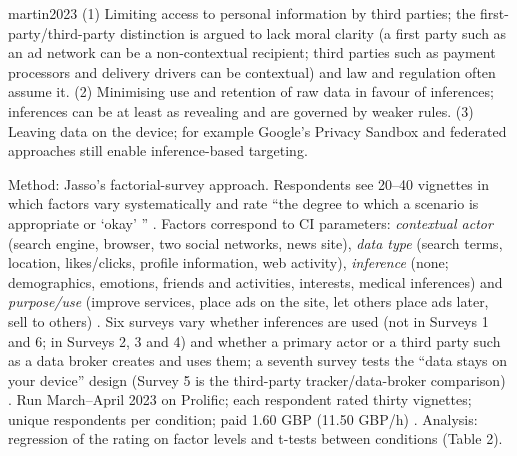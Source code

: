 \begin{papercard}{martin2023}
 (1) Limiting access to personal information by third parties; the first-party/third-party distinction is argued to lack moral clarity (a first party such as an ad network can be a non-contextual recipient; third parties such as payment processors and delivery drivers can be contextual) and law and regulation often assume it. (2) Minimising use and retention of raw data in favour of inferences; inferences can be at least as revealing and are governed by weaker rules. (3) Leaving data on the device; for example Google's Privacy Sandbox and federated approaches still enable inference-based targeting.

 Method: Jasso's factorial-survey approach. Respondents see 20--40 vignettes in which factors vary systematically and rate ``the degree to which a scenario is appropriate or `okay' '' . Factors correspond to CI parameters: \emph{contextual actor} (search engine, browser, two social networks, news site), \emph{data type} (search terms, location, likes/clicks, profile information, web activity), \emph{inference} (none; demographics, emotions, friends and activities, interests, medical inferences) and \emph{purpose/use} (improve services, place ads on the site, let others place ads later, sell to others) . Six surveys vary whether inferences are used (not in Surveys 1 and 6; in Surveys 2, 3 and 4) and whether a primary actor or a third party such as a data broker creates and uses them; a seventh survey tests the ``data stays on your device'' design (Survey 5 is the third-party tracker/data-broker comparison) . Run March--April 2023 on Prolific; each respondent rated thirty vignettes; unique respondents per condition; paid 1.60 GBP (11.50 GBP/h) . Analysis: regression of the rating on factor levels and t-tests between conditions (Table 2).


\end{papercard}
